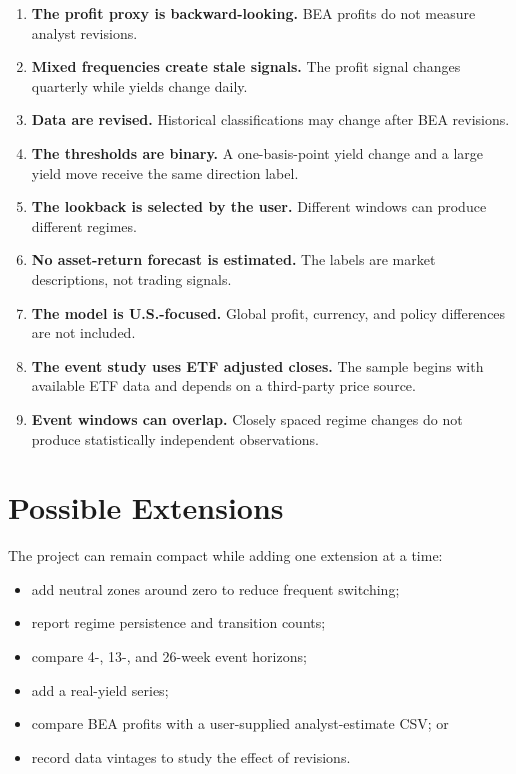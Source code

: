 \documentclass[11pt]{article}
\begin{document}
\begin{enumerate}
  \item \textbf{The profit proxy is backward-looking.} BEA profits do not
  measure analyst revisions.
  \item \textbf{Mixed frequencies create stale signals.} The profit signal
  changes quarterly while yields change daily.
  \item \textbf{Data are revised.} Historical classifications may change after
  BEA revisions.
  \item \textbf{The thresholds are binary.} A one-basis-point yield change and
  a large yield move receive the same direction label.
  \item \textbf{The lookback is selected by the user.} Different windows can
  produce different regimes.
  \item \textbf{No asset-return forecast is estimated.} The labels are market
  descriptions, not trading signals.
  \item \textbf{The model is U.S.-focused.} Global profit, currency, and
  policy differences are not included.
  \item \textbf{The event study uses ETF adjusted closes.} The sample begins
  with available ETF data and depends on a third-party price source.
  \item \textbf{Event windows can overlap.} Closely spaced regime changes do
  not produce statistically independent observations.
\end{enumerate}

\section{Possible Extensions}

The project can remain compact while adding one extension at a time:

\begin{itemize}
  \item add neutral zones around zero to reduce frequent switching;
  \item report regime persistence and transition counts;
  \item compare 4-, 13-, and 26-week event horizons;
  \item add a real-yield series;
  \item compare BEA profits with a user-supplied analyst-estimate CSV; or
  \item record data vintages to study the effect of revisions.
\end{itemize}
\end{document}
